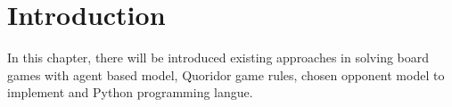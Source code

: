\chapter{Introduction}\label{chap:1}
  In this chapter, there will be introduced existing approaches in solving
board games with agent based model, Quoridor game rules, chosen opponent model
to implement and Python programming langue.
